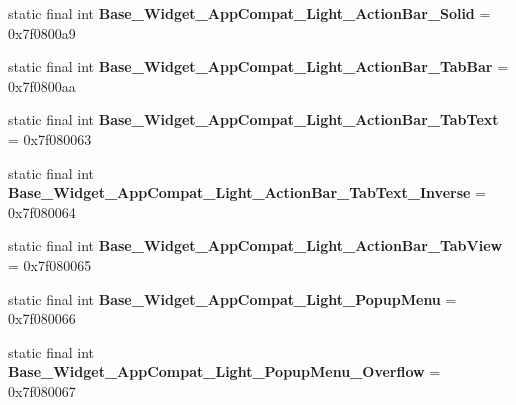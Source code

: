 \begin{DoxyCompactItemize}
\item 
\hypertarget{classandroid_1_1support_1_1design_1_1_r_1_1style_a9360c0e55ae8bf9ef5b45cec4d1ccb6c}{}static final int {\bfseries Base\+\_\+\+Widget\+\_\+\+App\+Compat\+\_\+\+Light\+\_\+\+Action\+Bar\+\_\+\+Solid} = 0x7f0800a9\label{classandroid_1_1support_1_1design_1_1_r_1_1style_a9360c0e55ae8bf9ef5b45cec4d1ccb6c}

\item 
\hypertarget{classandroid_1_1support_1_1design_1_1_r_1_1style_a220f9db69bc055885e7b9434ac9c5abe}{}static final int {\bfseries Base\+\_\+\+Widget\+\_\+\+App\+Compat\+\_\+\+Light\+\_\+\+Action\+Bar\+\_\+\+Tab\+Bar} = 0x7f0800aa\label{classandroid_1_1support_1_1design_1_1_r_1_1style_a220f9db69bc055885e7b9434ac9c5abe}

\item 
\hypertarget{classandroid_1_1support_1_1design_1_1_r_1_1style_adc7f1b36997f04d77852dd8510e6e408}{}static final int {\bfseries Base\+\_\+\+Widget\+\_\+\+App\+Compat\+\_\+\+Light\+\_\+\+Action\+Bar\+\_\+\+Tab\+Text} = 0x7f080063\label{classandroid_1_1support_1_1design_1_1_r_1_1style_adc7f1b36997f04d77852dd8510e6e408}

\item 
\hypertarget{classandroid_1_1support_1_1design_1_1_r_1_1style_a30acc6e75adeb415d02ac0eaf0fe96e3}{}static final int {\bfseries Base\+\_\+\+Widget\+\_\+\+App\+Compat\+\_\+\+Light\+\_\+\+Action\+Bar\+\_\+\+Tab\+Text\+\_\+\+Inverse} = 0x7f080064\label{classandroid_1_1support_1_1design_1_1_r_1_1style_a30acc6e75adeb415d02ac0eaf0fe96e3}

\item 
\hypertarget{classandroid_1_1support_1_1design_1_1_r_1_1style_a60c463b25e5453155c43096e82d13589}{}static final int {\bfseries Base\+\_\+\+Widget\+\_\+\+App\+Compat\+\_\+\+Light\+\_\+\+Action\+Bar\+\_\+\+Tab\+View} = 0x7f080065\label{classandroid_1_1support_1_1design_1_1_r_1_1style_a60c463b25e5453155c43096e82d13589}

\item 
\hypertarget{classandroid_1_1support_1_1design_1_1_r_1_1style_ae0baa30f59ccb138bfa0ee415debbda1}{}static final int {\bfseries Base\+\_\+\+Widget\+\_\+\+App\+Compat\+\_\+\+Light\+\_\+\+Popup\+Menu} = 0x7f080066\label{classandroid_1_1support_1_1design_1_1_r_1_1style_ae0baa30f59ccb138bfa0ee415debbda1}

\item 
\hypertarget{classandroid_1_1support_1_1design_1_1_r_1_1style_a61dcec87d76d5157b1216334f872be9d}{}static final int {\bfseries Base\+\_\+\+Widget\+\_\+\+App\+Compat\+\_\+\+Light\+\_\+\+Popup\+Menu\+\_\+\+Overflow} = 0x7f080067\label{classandroid_1_1support_1_1design_1_1_r_1_1style_a61dcec87d76d5157b1216334f872be9d}


\end{DoxyCompactItemize}
